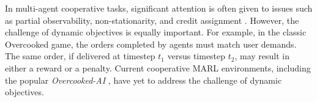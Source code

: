 In multi-agent cooperative tasks, significant attention is often given to issues such as partial observability\cite{zhu2022survey}, non-stationarity\cite{papoudakis2019dealing}, and credit assignment \cite{wang2021towards}. However, the challenge of dynamic objectives is equally important. For example, in the classic Overcooked game, the orders completed by agents must match user demands. The same order, if delivered at timestep $t_1$ versus timestep $t_2$, may result in either a reward or a penalty. Current cooperative MARL environments, including the popular \textit{Overcooked-AI} \cite{carroll2019utility}, have yet to address the challenge of dynamic objectives.

